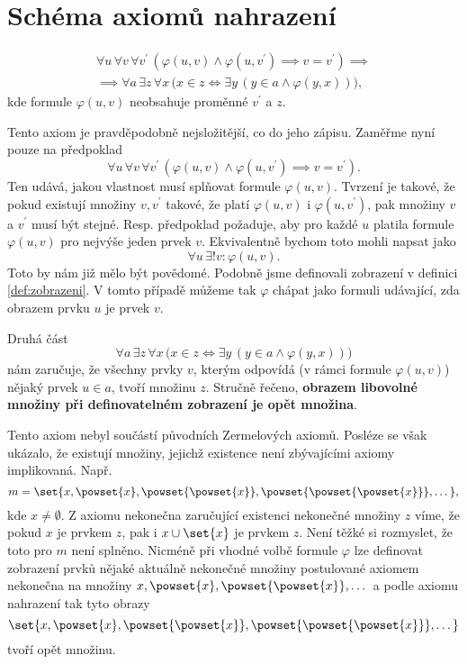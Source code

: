 \section{Schéma axiomů nahrazení}\label{sec:schema_axiomu_nahrazeni}
\begin{align*}
    \forall u\,\forall v\,\forall v^\prime\,(\varphi(u,v) \land \varphi(u,v^\prime) \implies v=v^\prime)\implies\\ \implies \forall a\,\exists z\,\forall x\,\big(x\in z \iff \exists y\,(y\in a \land \varphi(y,x))\big),
\end{align*}
kde formule $\varphi(u,v)$ neobsahuje proměnné $v^\prime$ a $z$.\par
Tento axiom je pravděpodobně nejsložitější, co do jeho zápisu. Zaměřme nyní pouze na předpoklad
\begin{equation*}
    \forall u\,\forall v\,\forall v^\prime\,(\varphi(u,v) \land \varphi(u,v^\prime) \implies v=v^\prime).
\end{equation*}
Ten udává, jakou vlastnost musí splňovat formule $\varphi(u,v)$. Tvrzení je takové, že pokud existují množiny $v,v^\prime$ takové, že platí $\varphi(u,v)$ i $\varphi(u,v^\prime)$, pak množiny $v$ a $v^\prime$ musí být stejné. Resp. předpoklad požaduje, aby pro každé $u$ platila formule $\varphi(u,v)$ pro nejvýše jeden prvek $v$. Ekvivalentně bychom toto mohli napsat jako
\begin{equation*}
    \forall u\,\exists! v: \varphi(u,v).
\end{equation*}
Toto by nám již mělo být povědomé. Podobně jsme definovali zobrazení v definici \ref{def:zobrazeni}. V tomto případě můžeme tak $\varphi$ chápat jako formuli udávající, zda obrazem prvku $u$ je prvek $v$.\par
Druhá část
\begin{equation*}
    \forall a\,\exists z\,\forall x\,\big(x\in z \iff \exists y\,(y\in a \land \varphi(y,x))\big)
\end{equation*}
nám zaručuje, že všechny prvky $v$, kterým odpovídá (v rámci formule $\varphi(u,v)$) nějaký prvek $u\in a$, tvoří množinu $z$. Stručně řečeno, \textbf{obrazem libovolné množiny při definovatelném zobrazení je opět množina}.\par
Tento axiom nebyl součástí původních Zermelových axiomů. Posléze se však ukázalo, že existují množiny, jejichž existence není zbývajícími axiomy implikovaná. Např.
\begin{equation*}
    m=\set{x,\powset{x},\powset{\powset{x}},\powset{\powset{\powset{x}}},\dots},
\end{equation*}
kde $x\neq\emptyset$. Z axiomu nekonečna zaručující existenci nekonečné množiny $z$ víme, že pokud $x$ je prvkem $z$, pak i $x\cup\set{x}$ je prvkem $z$. Není těžké si rozmyslet, že toto pro $m$ není splněno. Nicméně při vhodné volbě formule $\varphi$ lze definovat zobrazení prvků nějaké aktuálně nekonečné množiny postulované axiomem nekonečna na množiny $x,\powset{x},\powset{\powset{x}},\dots$ a podle axiomu nahrazení tak tyto obrazy
\begin{equation*}
    \set{x,\powset{x},\powset{\powset{x}},\powset{\powset{\powset{x}}},\dots}
\end{equation*}
tvoří opět množinu.
